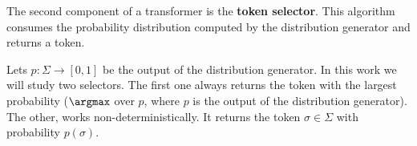 
The second component of a transformer is the \textbf{token selector}.
This algorithm consumes the probability distribution computed by the distribution generator and returns a token.

Lets $p : \Sigma \to [0,1]$ be the output of the distribution generator.
In this work we will study two selectors.
The first one always returns the token with the largest probability ($\argmax$ over $p$, where $p$ is the output of the distribution generator).
The other, works non-deterministically.
It returns the token $\sigma \in \Sigma$ with probability $p(\sigma)$.